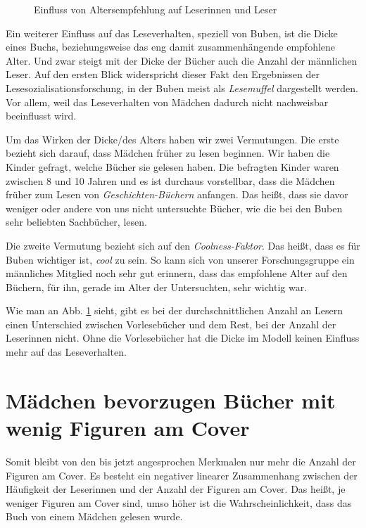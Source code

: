 \begin{figure}
\center
  \label{alter}
  \small

  \caption[Einfluss von Altersempfehlung]{Einfluss von Altersempfehlung auf Leserinnen und Leser}
\end{figure}

Ein weiterer Einfluss auf das Leseverhalten, speziell von Buben, ist die
Dicke eines Buchs, beziehungsweise das eng damit zusammenhängende
empfohlene Alter. Und zwar steigt mit der Dicke der Bücher auch die
Anzahl der männlichen Leser. Auf den ersten Blick widerspricht dieser
Fakt den Ergebnissen der Lesesozialisationsforschung, in der Buben meist
als \emph{Lesemuffel} dargestellt werden. Vor allem, weil das
Leseverhalten von Mädchen dadurch nicht nachweisbar beeinflusst wird.

Um das Wirken der Dicke/des Alters haben wir zwei Vermutungen. Die erste
bezieht sich darauf, dass Mädchen früher zu lesen beginnen. Wir haben
die Kinder gefragt, welche Bücher sie gelesen haben. Die befragten
Kinder waren zwischen 8 und 10 Jahren und es ist durchaus vorstellbar,
dass die Mädchen früher zum Lesen von \emph{Geschichten-Büchern}
anfangen. Das heißt, dass sie davor weniger oder andere von uns nicht
untersuchte Bücher, wie die bei den Buben sehr beliebten Sachbücher,
lesen.

Die zweite Vermutung bezieht sich auf den \emph{Coolness-Faktor}. Das
heißt, dass es für Buben wichtiger ist, \emph{cool} zu sein. So kann
sich von unserer Forschungsgruppe ein männliches Mitglied noch sehr gut
erinnern, dass das empfohlene Alter auf den Büchern, für ihn, gerade im
Alter der Untersuchten, sehr wichtig war.

Wie man an Abb. \ref{alter} sieht, gibt es bei der durchschnittlichen
Anzahl an Lesern einen Unterschied zwischen Vorlesebücher und dem Rest,
bei der Anzahl der Leserinnen nicht. Ohne die Vorlesebücher hat die
Dicke im Modell keinen Einfluss mehr auf das Leseverhalten.

\section{Mädchen bevorzugen Bücher mit wenig Figuren am Cover}

Somit bleibt von den bis jetzt angesprochen Merkmalen nur mehr die
Anzahl der Figuren am Cover. Es besteht ein negativer linearer
Zusammenhang zwischen der Häufigkeit der Leserinnen und der Anzahl der
Figuren am Cover. Das heißt, je weniger Figuren am Cover sind, umso
höher ist die Wahrscheinlichkeit, dass das Buch von einem Mädchen
gelesen wurde.

